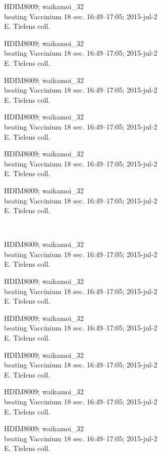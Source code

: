 \documentclass[2pt]{extarticle}
\begin{document}
\noindent
\parbox{0.16\textwidth}{\tiny \raggedright \rule[-0.3\baselineskip]{0pt}{10pt}HDIM8009; waikamoi\_32\\ beating Vaccinium 18 sec. 16:49--17:05; 2015-jul-2\\ E. Tielens coll.}
\parbox{0.16\textwidth}{\tiny \raggedright \rule[-0.3\baselineskip]{0pt}{10pt}HDIM8009; waikamoi\_32\\ beating Vaccinium 18 sec. 16:49--17:05; 2015-jul-2\\ E. Tielens coll.}
\parbox{0.16\textwidth}{\tiny \raggedright \rule[-0.3\baselineskip]{0pt}{10pt}HDIM8009; waikamoi\_32\\ beating Vaccinium 18 sec. 16:49--17:05; 2015-jul-2\\ E. Tielens coll.}
\parbox{0.16\textwidth}{\tiny \raggedright \rule[-0.3\baselineskip]{0pt}{10pt}HDIM8009; waikamoi\_32\\ beating Vaccinium 18 sec. 16:49--17:05; 2015-jul-2\\ E. Tielens coll.}
\parbox{0.16\textwidth}{\tiny \raggedright \rule[-0.3\baselineskip]{0pt}{10pt}HDIM8009; waikamoi\_32\\ beating Vaccinium 18 sec. 16:49--17:05; 2015-jul-2\\ E. Tielens coll.}
\parbox{0.16\textwidth}{\tiny \raggedright \rule[-0.3\baselineskip]{0pt}{10pt}HDIM8009; waikamoi\_32\\ beating Vaccinium 18 sec. 16:49--17:05; 2015-jul-2\\ E. Tielens coll.} \\ 
\vspace{0.001in} 

\noindent
\parbox{0.16\textwidth}{\tiny \raggedright \rule[-0.3\baselineskip]{0pt}{10pt}HDIM8009; waikamoi\_32\\ beating Vaccinium 18 sec. 16:49--17:05; 2015-jul-2\\ E. Tielens coll.}
\parbox{0.16\textwidth}{\tiny \raggedright \rule[-0.3\baselineskip]{0pt}{10pt}HDIM8009; waikamoi\_32\\ beating Vaccinium 18 sec. 16:49--17:05; 2015-jul-2\\ E. Tielens coll.}
\parbox{0.16\textwidth}{\tiny \raggedright \rule[-0.3\baselineskip]{0pt}{10pt}HDIM8009; waikamoi\_32\\ beating Vaccinium 18 sec. 16:49--17:05; 2015-jul-2\\ E. Tielens coll.}
\parbox{0.16\textwidth}{\tiny \raggedright \rule[-0.3\baselineskip]{0pt}{10pt}HDIM8009; waikamoi\_32\\ beating Vaccinium 18 sec. 16:49--17:05; 2015-jul-2\\ E. Tielens coll.}
\parbox{0.16\textwidth}{\tiny \raggedright \rule[-0.3\baselineskip]{0pt}{10pt}HDIM8009; waikamoi\_32\\ beating Vaccinium 18 sec. 16:49--17:05; 2015-jul-2\\ E. Tielens coll.}
\parbox{0.16\textwidth}{\tiny \raggedright \rule[-0.3\baselineskip]{0pt}{10pt}HDIM8009; waikamoi\_32\\ beating Vaccinium 18 sec. 16:49--17:05; 2015-jul-2\\ E. Tielens coll.} \\ 
\vspace{0.001in} 
\end{document}
